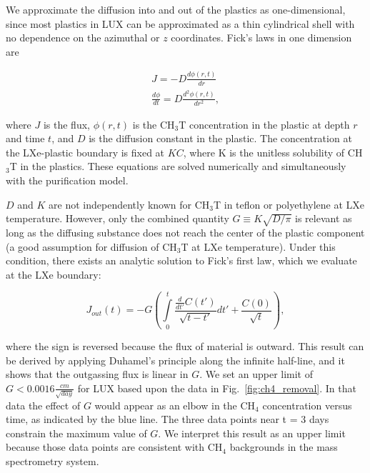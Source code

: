 We approximate the diffusion into and out of the plastics as one-dimensional, since most plastics in LUX can be approximated as a thin cylindrical shell with no dependence on the azimuthal or $z$ coordinates.  Fick's laws in one dimension are

\begin{align}
J=-D\frac{d \phi(r,t)}{d r}  \\
\frac{d \phi}{d t} = D \frac{d^2 \phi(r,t)}{d r^2} , 
\end{align}

\noindent 
where $J$ is the flux, $\phi(r,t)$ is the CH$_3$T  concentration in the plastic at depth $r$ and time $t$, and $D$ is the diffusion constant in the plastic. The concentration at the LXe-plastic boundary is fixed at $KC$, where K is the unitless solubility of CH$_3$T in the plastics. These equations are solved numerically and simultaneously with the purification model. 

$D$ and $K$ are not independently known for CH$_3$T in teflon or polyethylene at LXe temperature. However, only the combined quantity $G \equiv K \sqrt{ D/ \pi }$ is relevant as long as the diffusing substance does not reach the center of the plastic component (a good assumption for diffusion of CH$_3$T at LXe temperature). Under this condition, there exists an analytic solution to Fick's first law, which we evaluate at the LXe boundary:


\begin{equation}
J_{out}(t)= - G\left( \int \limits_0^t \frac{\frac{d}{dt'}C(t')}{\sqrt{t-t'}} dt' + \frac{C(0)}{\sqrt{t}}\right),
\end{equation}

\noindent
where the sign is reversed because the flux of material is outward. This result can be derived by applying Duhamel's principle along the infinite half-line, and it shows that the outgassing flux is linear in $G$. We set an upper limit of $G<0.0016 \frac{cm}{\sqrt{day}}$ for LUX based upon the data in Fig.~\ref{fig:ch4_removal}. In that data the effect of $G$ would appear as an elbow in the CH$_4$ concentration versus time, as indicated by the blue line. The three data points near t = 3 days constrain the maximum value of $G$. We interpret this result as an upper limit because those data points are consistent with CH$_4$ backgrounds in the mass spectrometry system.

